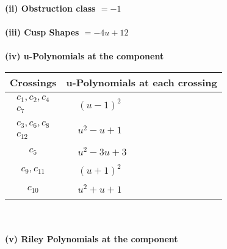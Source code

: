 \documentclass[1p]{elsarticle_modified}
\theoremstyle{definition}
\begin{document}
\flushleft \textbf{(ii) Obstruction class $= -1$}\\~\\
\flushleft \textbf{(iii) Cusp Shapes $= -4 u+12$}\\~\\
\newpage\renewcommand{\arraystretch}{1}
\flushleft \textbf{(iv) u-Polynomials at the component}\newline \\
\begin{tabular}{m{50pt}|m{274pt}}
Crossings & \hspace{64pt}u-Polynomials at each crossing \\
\hline $$\begin{aligned}c_{1},c_{2},c_{4}\\c_{7}\end{aligned}$$&$\begin{aligned}
&(u-1)^2
\end{aligned}$\\
\hline $$\begin{aligned}c_{3},c_{6},c_{8}\\c_{12}\end{aligned}$$&$\begin{aligned}
&u^2- u+1
\end{aligned}$\\
\hline $$\begin{aligned}c_{5}\end{aligned}$$&$\begin{aligned}
&u^2-3 u+3
\end{aligned}$\\
\hline $$\begin{aligned}c_{9},c_{11}\end{aligned}$$&$\begin{aligned}
&(u+1)^2
\end{aligned}$\\
\hline $$\begin{aligned}c_{10}\end{aligned}$$&$\begin{aligned}
&u^2+u+1
\end{aligned}$\\
\hline
\end{tabular}\\~\\
\newpage\renewcommand{\arraystretch}{1}
\flushleft \textbf{(v) Riley Polynomials at the component}\newline \\
\end{document}
